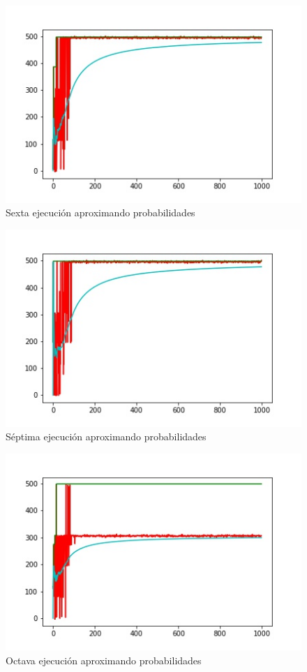\begin{figure}
  \centering
    \includegraphics[scale=0.9]{grafi6.jpg}
  \caption[Sexta ejecución]{Sexta ejecución aproximando probabilidades}
  \label{graf6}
\end{figure}
\begin{figure}
  \centering
    \includegraphics[scale=0.9]{grafi7.jpg}
  \caption[Séptima ejecución]{Séptima ejecución aproximando probabilidades}
  \label{graf7}
\end{figure}
\begin{figure}
  \centering
    \includegraphics[scale=0.9]{grafi8.jpg}
  \caption[Octava ejecución]{Octava ejecución aproximando probabilidades}
  \label{graf8}
\end{figure}
